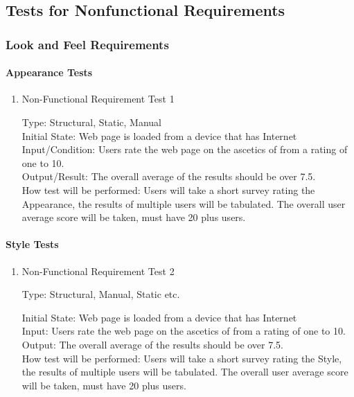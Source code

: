 \documentclass[12pt, titlepage]{article}
\begin{document}
\subsection{Tests for Nonfunctional Requirements}

\subsubsection{Look and Feel Requirements}
		
\paragraph{Appearance Tests}

\begin{enumerate}

\item{Non-Functional Requirement Test 1\\}

Type: Structural, Static, Manual \\
					
Initial State: Web page is loaded from a device that has Internet \\
					
Input/Condition: Users rate the web page on the ascetics of from a rating of one to 10. \\
					
Output/Result: The overall average of the results should be over 7.5. \\
					
How test will be performed: Users will take a short survey rating the Appearance, the results of multiple users will be
tabulated. The overall user average score will be taken, must have 20 plus users. \\

\end{enumerate}
\paragraph{Style Tests}

\begin{enumerate}			
\item{Non-Functional Requirement Test 2\\}

Type: Structural, Manual, Static etc.
					
Initial State: Web page is loaded from a device that has Internet \\
					
Input:  Users rate the web page on the ascetics of from a rating of one to 10. \\
					
Output:  The overall average of the results should be over 7.5. \\
					
How test will be performed: Users will take a short survey rating the Style, the results of multiple users will be
tabulated. The overall user average score will be taken, must have 20 plus users. \\

\end{enumerate}
\end{document}
